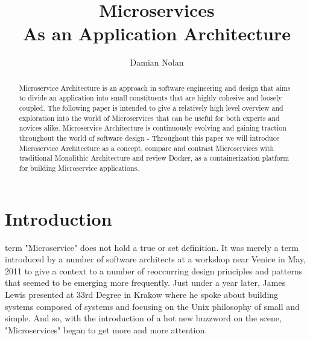 \documentclass[journal]{IEEEtran}
\begin{document}
\title{Microservices \\ As an Application Architecture}


\author{Damian Nolan}

\maketitle

\begin{abstract}
Microservice Architecture is an approach in software engineering and design that aims to divide an application into small constituents that are highly cohesive and loosely coupled. The following paper is intended to give a relatively high level overview and exploration into the world of Microservices that can be useful for both experts and novices alike. Microservice Architecture is continuously evolving and gaining traction throughout the world of software design - Throughout this paper we will introduce Microservice Architecture as a concept, compare and contrast Microservices with traditional Monolithic Architecture and review Docker, as a containerization platform for building Microservice applications.
\end{abstract}

\section{Introduction}
% 
% 
% 
% 
 term "Microservice" does not hold a true or set definition. It was merely a term introduced by a number of software architects at a workshop near Venice in May, 2011 to give a context to a number of reoccurring design principles and patterns that seemed to be emerging more frequently.
	Just under a year later, James Lewis presented at 33rd Degree in Krakow where he spoke about building systems composed of systems and focusing on the Unix philosophy of small and simple. \cite{JamesLewis33rdDegree} 
And so, with the introduction of a hot new buzzword on the scene, "Microservices" began to get more and more attention. 
\end{document}
